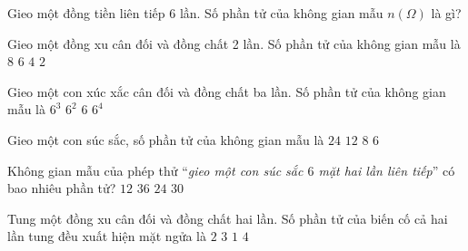 \begin{bt}%
	Gieo một đồng tiền liên tiếp $6$ lần. Số phần tử của không gian mẫu $n(\Omega)$ là gì?
\end{bt}

\begin{ex}%
	Gieo một đồng xu cân đối và đồng chất 2 lần. Số phần tử của không gian mẫu là 
	\choice 
		{$  8 $}
		{$  6 $}
		{\True  $ 4 $}
		{$ 2 $ } 
\end{ex}

\begin{ex}%
	Gieo một con xúc xắc cân đối và đồng chất ba lần. Số  phần tử của không gian mẫu là
	 \choice
		 {\True $6^3$}
		 {$6^2$}
		{$6$} 
		 {$6^4$}
\end{ex}

\begin{ex}%
	Gieo một con súc sắc, số phần tử  của không gian mẫu là
	 \choice
		 {$24$}
		 {$12$}
		{$8$} 
		{\True $6$} 
\end{ex}

\begin{ex}%
	Không gian mẫu của phép thử ``\textit{gieo một con súc sắc $6$  mặt hai lần liên tiếp}'' có bao nhiêu phần tử?
	 \choice
		 {$12$}
		{\True  $36$}
		{$24$} 
		 {$30$}
\end{ex}

\begin{ex}%
	Tung một đồng xu cân đối và đồng chất hai lần. Số  phần tử của biến cố cả hai lần tung đều xuất hiện mặt ngửa là
	\choice 
		 {$2$}
		 {$3$}
		{\True $1$} 
		 {$4$}
\end{ex}

